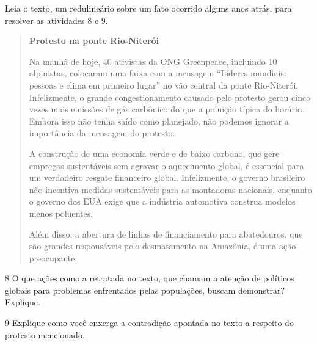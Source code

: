
Leia o texto, um redulineário sobre um fato ocorrido alguns anos atrás,
para resolver as atividades 8 e 9.

\begin{quote}
\textbf{Protesto na ponte Rio-Niterói}

Na manhã de hoje, 40 ativistas da ONG Greenpeace, incluindo 10
alpinistas, colocaram uma faixa com a mensagem ``Líderes mundiais:
pessoas e clima em primeiro lugar'' no vão central da ponte Rio-Niterói.
Infelizmente, o grande congestionamento causado pelo protesto gerou
cinco vezes mais emissões de gás carbônico do que a poluição típica do
horário. Embora isso não tenha saído como planejado, não podemos ignorar
a importância da mensagem do protesto.

A construção de uma economia verde e de baixo carbono, que gere empregos
sustentáveis sem agravar o aquecimento global, é essencial para um
verdadeiro resgate financeiro global. Infelizmente, o governo brasileiro
não incentiva medidas sustentáveis para as montadoras nacionais,
enquanto o governo dos EUA exige que a indústria automotiva construa
modelos menos poluentes.

Além disso, a abertura de linhas de financiamento para abatedouros, que
são grandes responsáveis pelo desmatamento na Amazônia, é uma ação
preocupante.

\end{quote}

\num{8} O que ações como a retratada no texto, que chamam a atenção de
políticos globais para problemas enfrentados pelas populações, buscam
demonstrar? Explique.


\num{9} Explique como você enxerga a contradição apontada no texto a
respeito do protesto mencionado.



